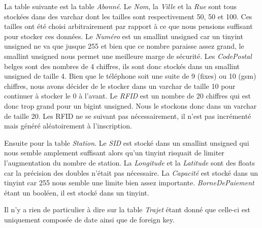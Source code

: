 \documentclass[a4paper, 12pt]{report}
\begin{document}
La table suivante est la table \textit{Abonné}. Le \textit{Nom}, la \textit{Ville} et la \textit{Rue} sont tous stockées dans des varchar dont les tailles sont respectivement 50, 50 et 100. Ces tailles ont été choisi arbitrairement par rapport à ce que nous pensions suffisant pour stocker ces données. Le \textit{Numéro} est un smallint unsigned car un tinyint unsigned ne va que jusque 255 et bien que ce nombre paraisse assez grand, le smallint unsigned nous permet une meilleure marge de sécurité. Les \textit{CodePostal} belges sont des nombres de 4 chiffres, ils sont donc stockés dans un smallint unsigned de taille 4. Bien que le téléphone soit une suite de 9 (fixes) ou 10 (gsm) chiffres, nous avons décider de le stocker dans un varchar de taille 10 pour continuer à stocker le 0 à l'avant. Le \textit{RFID} est un nombre de 20 chiffres qui est donc trop grand pour un bigint unsigned. Nous le stockons donc dans un varchar de taille 20. Les RFID ne se suivant pas nécessairement, il n'est pas incrémenté mais généré aléatoirement à l'inscription.

Ensuite pour la table \textit{Station}. Le \textit{SID} est stocké dans un smallint unsigned qui nous semble amplement suffisant alors qu'un tinyint risquait de limiter l'augmentation du nombre de station. La \textit{Longitude} et la \textit{Latitude} sont des floats car la précision des doubles n'était pas nécessaire. La \textit{Capacité} est stocké dans un tinyint car 255 nous semble une limite bien assez importante. \textit{BorneDePaiement} étant un booléen, il est stocké dans un tinyint.

Il n'y a rien de particulier à dire sur la table \textit{Trajet} étant donné que celle-ci est uniquement composée de date ainsi que de foreign key.
\end{document}
